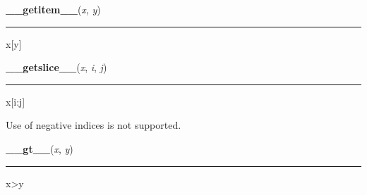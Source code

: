     \label{resource:struct_rusage:__getitem__}

    \vspace{0.5ex}

\hspace{.8\funcindent}\begin{boxedminipage}{\funcwidth}

    \raggedright \textbf{\_\_getitem\_\_}(\textit{x}, \textit{y})

    \vspace{-1.5ex}

    \rule{\textwidth}{0.5\fboxrule}
\setlength{\parskip}{2ex}
    x[y]

\setlength{\parskip}{1ex}
    \end{boxedminipage}

    \label{resource:struct_rusage:__getslice__}

    \vspace{0.5ex}

\hspace{.8\funcindent}\begin{boxedminipage}{\funcwidth}

    \raggedright \textbf{\_\_getslice\_\_}(\textit{x}, \textit{i}, \textit{j})

    \vspace{-1.5ex}

    \rule{\textwidth}{0.5\fboxrule}
\setlength{\parskip}{2ex}
    x[i:j]

    Use of negative indices is not supported.

\setlength{\parskip}{1ex}
    \end{boxedminipage}

    \label{resource:struct_rusage:__gt__}

    \vspace{0.5ex}

\hspace{.8\funcindent}\begin{boxedminipage}{\funcwidth}

    \raggedright \textbf{\_\_gt\_\_}(\textit{x}, \textit{y})

    \vspace{-1.5ex}

    \rule{\textwidth}{0.5\fboxrule}
\setlength{\parskip}{2ex}
    x{\textgreater}y

\setlength{\parskip}{1ex}
    \end{boxedminipage}

